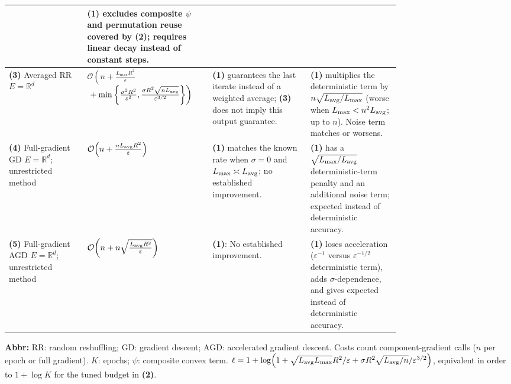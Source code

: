 \begin{table}[tp]
\begin{threeparttable}
\begin{tabularx}{\linewidth}{@{}>{\raggedright\arraybackslash}p{0.20\linewidth}>{\raggedright\arraybackslash}p{0.32\linewidth}>{\raggedright\arraybackslash}p{0.25\linewidth}>{\raggedright\arraybackslash}X@{}}
& \textbf{(1)} excludes composite $\psi$ and permutation reuse covered by \textbf{(2)}; requires linear decay instead of constant steps. \\
\midrule
\textbf{(3)} Averaged RR \citep[Thm.~1, Cor.~1]{csrrLiu2026v1}\newline $E=\mathbb{R}^d$
& $\mathcal{O}\!\left(n+\frac{L_{\max}R^2}{\varepsilon}\right.$\newline $\left.{}+\min\left\{\frac{\sigma^2R^2}{\varepsilon^2},\frac{\sigma R^2\sqrt{nL_{\rm avg}}}{\varepsilon^{3/2}}\right\}\right)$
& \textbf{(1)} guarantees the last iterate instead of a weighted average; \textbf{(3)} does not imply this output guarantee.
& \textbf{(1)} multiplies the deterministic term by $n\sqrt{L_{\rm avg}/L_{\max}}$ (worse when $L_{\max}<n^2L_{\rm avg}$; up to $n$). Noise term matches or worsens. \\
\midrule
\textbf{(4)} Full-gradient GD \citep[Cor.~2.1.2]{rrNesterov2018Lectures}\newline $E=\mathbb{R}^d$; unrestricted method
& $\mathcal{O}\!\left(n+\frac{nL_{\rm avg}R^2}{\varepsilon}\right)$
& \textbf{(1)} matches the known rate when $\sigma=0$ and $L_{\max}\asymp L_{\rm avg}$; no established improvement.
& \textbf{(1)} has a $\sqrt{L_{\max}/L_{\rm avg}}$ deterministic-term penalty and an additional noise term; expected instead of deterministic accuracy. \\
\midrule
\textbf{(5)} Full-gradient AGD \citep[Thm.~2.2.2]{rrNesterov2018Lectures}\newline $E=\mathbb{R}^d$; unrestricted method
& $\mathcal{O}\!\left(n+n\sqrt{\frac{L_{\rm avg}R^2}{\varepsilon}}\right)$
& \textbf{(1)}: No established improvement.
& \textbf{(1)} loses acceleration ($\varepsilon^{-1}$ versus $\varepsilon^{-1/2}$ deterministic term), adds $\sigma$-dependence, and gives expected instead of deterministic accuracy. \\
\bottomrule
\end{tabularx}
\begin{tablenotes}[flushleft]\footnotesize
\item[] \textbf{Abbr:} RR: random reshuffling; GD: gradient descent; AGD: accelerated gradient descent. Costs count component-gradient calls ($n$ per epoch or full gradient). $K$: epochs; $\psi$: composite convex term. $\ell=1+\log\!\left(1+\sqrt{L_{\rm avg}L_{\max}}R^2/\varepsilon+\sigma R^2\sqrt{L_{\rm avg}/n}/\varepsilon^{3/2}\right)$, equivalent in order to $1+\log K$ for the tuned budget in \textbf{(2)}.
\end{tablenotes}
\end{threeparttable}
\end{table}
\clearpage
